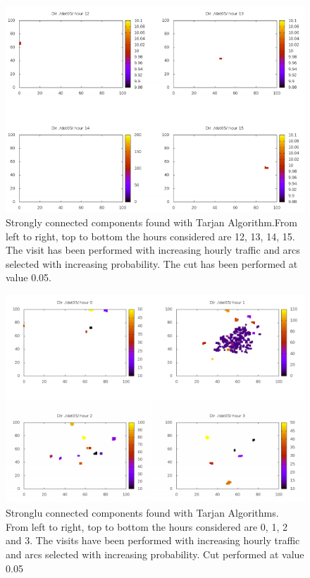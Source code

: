 \documentclass[12pt,a4paper]{article}
\begin{document}
\begin{figure}
\centering
\includegraphics[scale=0.5]{tarjanscc.png}
\caption{Strongly connected components found with Tarjan Algorithm.From left to right, top to bottom the hours considered are 12, 13, 14, 15.
The visit has been performed with increasing hourly traffic and arcs selected with increasing probability. 
The cut has been performed at value 0.05.}
\label{fig:tarjan1}
\end{figure}
\begin{figure}
\centering
\includegraphics[scale=0.6]{tarjanscc2.png}
\caption{Stronglu connected components found with Tarjan Algorithms. From left to right, top to bottom the hours considered are 0, 1, 2 and 3.
The visits have been performed with increasing hourly traffic and arcs selected with increasing probability.
Cut performed at value 0.05}
\label{fig:tarjan2}
\end{figure}
\end{document}
